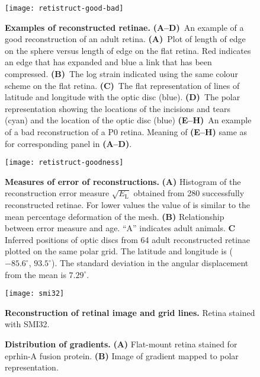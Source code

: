 \documentclass[10pt]{article}
\begin{document}
\begin{figure}[!ht]
  \centering
  \texttt{[image: retistruct-good-bad]}

  \caption{\textbf{Examples of reconstructed retinae.}
    \textbf{(A--D)}~An example of a good reconstruction of an adult
    retina.  \textbf{(A)}~Plot of length of edge on the sphere versus
    length of edge on the flat retina. Red indicates an edge that has
    expanded and blue a link that has been compressed.
    \textbf{(B)}~The log strain indicated using the same colour scheme
    on the flat retina. \textbf{(C)}~The flat representation of lines
    of latitude and longitude with the optic disc
    (blue). \textbf{(D)}~The polar representation showing the
    locations of the incisions and tears (cyan) and the location of
    the optic disc (blue) \textbf{(E--H)}~An example of a bad
    reconstruction of a P0 retina. Meaning of \textbf{(E--H)} same as
    for corresponding panel in \textbf{(A--D)}.}
  \label{retistruct_plos:fig:examples}
\end{figure}

\begin{figure}[!ht]
  \centering
  \texttt{[image: retistruct-goodness]}
  \caption{\textbf{Measures of error of reconstructions.}
    \textbf{(A)} Histogram of the reconstruction error measure
    $\sqrt{E_\mathrm{L}}$ obtained from 280 successfully reconstructed
    retinae. For lower values the value of is similar to the mean
    percentage deformation of the mesh. \textbf{(B)} Relationship
    between error measure and age. ``A'' indicates adult
    animals. \textbf{C} Inferred positions of optic discs from 64
    adult reconstructed retinae plotted on the same polar grid. The
    latitude and longitude is ($-85.6^\circ$, $93.5^\circ$). The
    standard deviation in the angular displacement from the mean is
    $7.29^\circ$.}
  \label{retistruct_plos:fig:summary}
\end{figure}

\begin{figure}[!ht]
  \centering
  \texttt{[image: smi32]}
  \caption{\textbf{Reconstruction of retinal image and grid lines.}
    Retina stained with SMI32. }
  \label{retistruct_plos:fig:superpose}
\end{figure}

\begin{figure}[!ht]
  \centering
  \caption{\textbf{Distribution of gradients.}
    \textbf{(A)} Flat-mount retina stained for eprhin-A fusion
    protein. \textbf{(B)} Image of gradient mapped to polar
    representation.  }
  \label{retistruct_plos:fig:gradients}
\end{figure}
\end{document}
